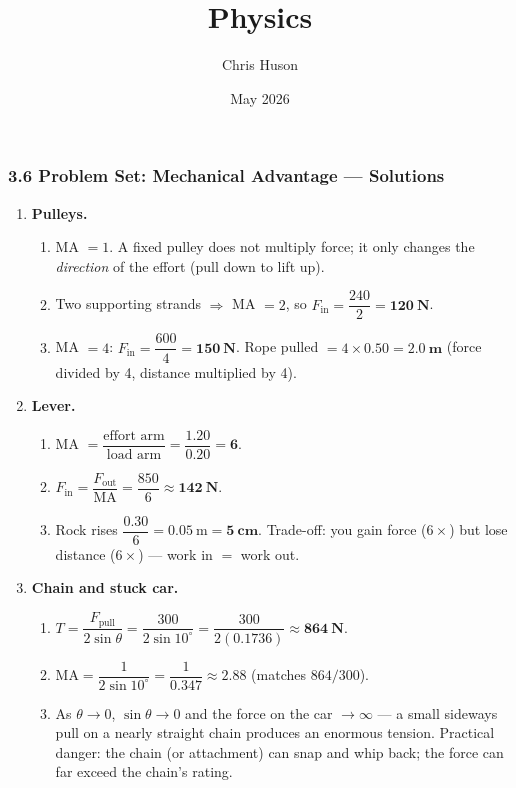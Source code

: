 \documentclass[12pt, twoside]{article}
\title{Physics}
\author{Chris Huson}
\date{May 2026}
\begin{document}
\subsubsection*{3.6 Problem Set: Mechanical Advantage --- Solutions}

\begin{enumerate}[itemsep=0.4cm]

\item \textbf{Pulleys.}
  \begin{enumerate}[itemsep=0.25cm]
    \item MA $=1$. A fixed pulley does not multiply force; it only changes the \emph{direction} of the effort (pull down to lift up).
    \item Two supporting strands $\Rightarrow$ MA $=2$, so $F_\text{in}=\dfrac{240}{2}=\mathbf{120~\text{N}}$.
    \item MA $=4$: $F_\text{in}=\dfrac{600}{4}=\mathbf{150~\text{N}}$. Rope pulled $=4\times0.50=\mathbf{2.0~\text{m}}$ (force divided by 4, distance multiplied by 4).
  \end{enumerate}

\item \textbf{Lever.}
  \begin{enumerate}[itemsep=0.25cm]
    \item MA $=\dfrac{\text{effort arm}}{\text{load arm}}=\dfrac{1.20}{0.20}=\mathbf{6}$.
    \item $F_\text{in}=\dfrac{F_\text{out}}{\text{MA}}=\dfrac{850}{6}\approx\mathbf{142~\text{N}}$.
    \item Rock rises $\dfrac{0.30}{6}=0.05~\text{m}=\mathbf{5~\text{cm}}$. Trade-off: you gain force ($6\times$) but lose distance ($6\times$) --- work in $=$ work out.
  \end{enumerate}

\item \textbf{Chain and stuck car.}
  \begin{enumerate}[itemsep=0.25cm]
    \item $T=\dfrac{F_\text{pull}}{2\sin\theta}=\dfrac{300}{2\sin10^\circ}=\dfrac{300}{2(0.1736)}\approx\mathbf{864~\text{N}}$.
    \item $\text{MA}=\dfrac{1}{2\sin10^\circ}=\dfrac{1}{0.347}\approx\mathbf{2.88}$ (matches $864/300$).
    \item As $\theta\to0$, $\sin\theta\to0$ and the force on the car $\to\infty$ --- a small sideways pull on a nearly straight chain produces an enormous tension. Practical danger: the chain (or attachment) can snap and whip back; the force can far exceed the chain's rating.
  \end{enumerate}


\end{enumerate}
\end{document}
